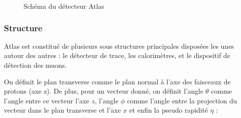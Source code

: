 \documentclass[11pt]{article} %
\begin{document}
\begin{figure}[H]
\centering
  \caption{Schéma du détecteur Atlas}
\label{fig:atlas_detector}

\end{figure}

\subsubsection{Structure}

Atlas est constitué de plusieurs sous structures principales disposées les unes autour des autres : le détecteur de trace, les calorimètres, et le dispositif de détection des muons.

On définit le plan transverse comme le plan normal à l'axe des faisceaux de protons (axe z).
De plus, pour un vecteur donné, on définit l'angle $\theta$ comme l'angle entre ce vecteur l'axe $z$,  l'angle $\phi$ comme l'angle entre la projection du vecteur dans le plan transverse et l'axe $x$ et enfin la pseudo rapidité $\eta$ :
\end{document}
